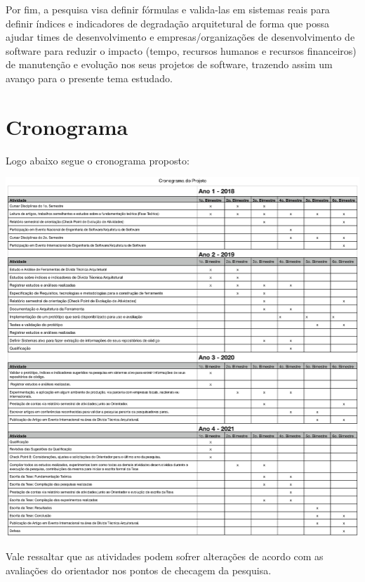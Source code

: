 \documentclass[
	12pt,				%
	openright,			%
	twoside,			%
	a4paper,			%
	english,			%
	french,				%
	spanish,			%
	brazil,				%
	]{abntex2}
\begin{document}
Por fim, a pesquisa visa definir fórmulas e valida-las em sistemas
reais para definir índices e indicadores de degradação arquitetural
de forma que possa ajudar times de desenvolvimento e empresas/organizações
de desenvolvimento de software para reduzir o impacto (tempo, recursos
humanos e recursos financeiros) de manutenção e evolução nos seus
projetos de software, trazendo assim um avanço para o presente tema
estudado.

\chapter{Cronograma}

Logo abaixo segue o cronograma proposto:

\includegraphics[scale=0.45]{cronograma.png}

Vale ressaltar que as atividades podem sofrer alterações de acordo
com as avaliações do orientador nos pontos de checagem da pesquisa.
\pagebreak{} 




% 


\end{document}
